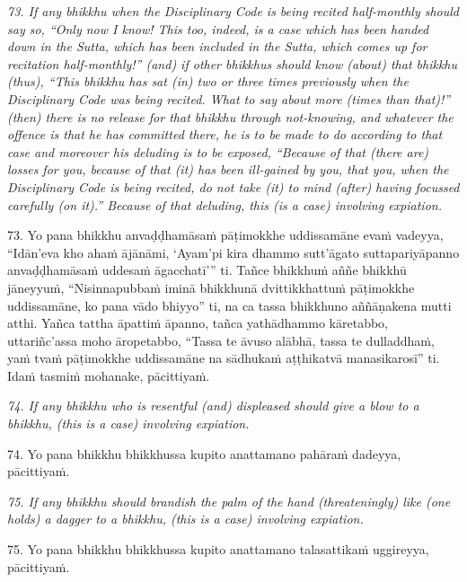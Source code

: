 \documentclass[11pt]{article}
\begin{document}
\begin{paracol}{2}
\begin{column}
{\itshape\footnotesize
73. If any bhikkhu when the Disciplinary Code is being recited half-monthly should say so, “Only now I know! This too, indeed, is a case which has been handed down in the Sutta, which has been included in the Sutta, which comes up for recitation half-monthly!” (and) if other bhikkhus should know (about) that bhikkhu (thus), “This bhikkhu has sat (in) two or three times previously when the Disciplinary Code was being recited. What to say about more (times than that)!” (then) there is no release for that bhikkhu through not-knowing, and whatever the offence is that he has committed there, he is to be made to do according to that case and moreover his deluding is to be exposed, “Because of that (there are) losses for you, because of that (it) has been ill-gained by you, that you, when the Disciplinary Code is being recited, do not take (it) to mind (after) having focussed carefully (on it).” Because of that deluding, this (is a case) involving expiation.
}
\switchcolumn

\begin{flushleft}
73. Yo pana bhikkhu anvaḍḍhamāsaṁ pāṭimokkhe uddissamāne evaṁ vadeyya, “Idān’eva kho ahaṁ ājānāmi, ‘Ayam’pi kira dhammo sutt’āgato suttapariyāpanno anvaḍḍhamāsaṁ uddesaṁ āgacchatī’” ti. Tañce bhikkhuṁ aññe bhikkhū jāneyyuṁ, “Nisinnapubbaṁ iminā bhikkhunā dvittikkhattuṁ pāṭimokkhe uddissamāne, ko pana vādo bhiyyo” ti, na ca tassa bhikkhuno aññāṇakena mutti atthi. Yañca tattha āpattiṁ āpanno, tañca yathādhammo kāretabbo, uttariñc’assa moho āropetabbo, “Tassa te āvuso alābhā, tassa te dulladdhaṁ, yaṁ tvaṁ pāṭimokkhe uddissamāne na sādhukaṁ aṭṭhikatvā manasikarosī” ti. Idaṁ tasmiṁ mohanake, pācittiyaṁ.
\switchcolumn*
\end{flushleft}

{\itshape\footnotesize
74. If any bhikkhu who is resentful (and) displeased should give a blow to a bhikkhu, (this is a case) involving expiation.
}
\switchcolumn

\begin{flushleft}
74. Yo pana bhikkhu bhikkhussa kupito anattamano pahāraṁ dadeyya, pācittiyaṁ.
\switchcolumn*
\end{flushleft}

{\itshape\footnotesize
75. If any bhikkhu should brandish the palm of the hand (threateningly) like (one holds) a dagger to a bhikkhu, (this is a case) involving expiation.
}
\switchcolumn

\begin{flushleft}
75. Yo pana bhikkhu bhikkhussa kupito anattamano talasattikaṁ uggireyya, pācittiyaṁ.
\switchcolumn*
\end{flushleft}


\end{column}
\end{paracol}
\end{document}
